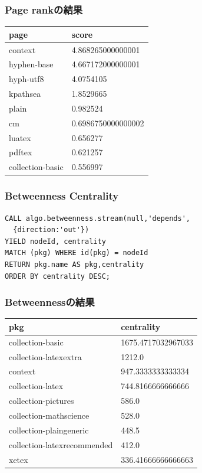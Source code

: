 \documentclass[hyperref]{beamer}
\begin{document}
\begin{frame}[fragile]
  \frametitle{Page rankの結果}
  \begin{tabular}{ll}
    \toprule
    page & score\\
    \midrule
context & 4.868265000000001\\
hyphen-base                 &4.667172000000001  \\
hyph-utf8                   &4.0754105          \\
kpathsea                    &1.8529665          \\
plain                       &0.982524           \\
cm                          &0.6986750000000002 \\
luatex                      &0.656277           \\
pdftex                      &0.621257           \\
    collection-basic            &0.556997           \\
    \bottomrule
  \end{tabular}
\end{frame}

\begin{frame}[fragile]
  \frametitle{Betweenness Centrality}
\begin{lstlisting}
CALL algo.betweenness.stream(null,'depends',
  {direction:'out'})
YIELD nodeId, centrality
MATCH (pkg) WHERE id(pkg) = nodeId
RETURN pkg.name AS pkg,centrality
ORDER BY centrality DESC;
\end{lstlisting}
\end{frame}

\begin{frame}
  \frametitle{Betweennessの結果}
  \begin{tabular}{ll}
    \toprule
    pkg &centrality　\\
    \midrule
    collection-basic &1675.4717032967033\\
    collection-latexextra & 1212.0             \\
    context & 947.3333333333334  \\
    collection-latex & 744.8166666666666  \\
    collection-pictures & 586.0              \\
    collection-mathscience & 528.0              \\
    collection-plaingeneric & 448.5              \\
    collection-latexrecommended & 412.0              \\
    xetex & 336.41666666666663 \\
    \bottomrule
  \end{tabular}
\end{frame}
\end{document}
